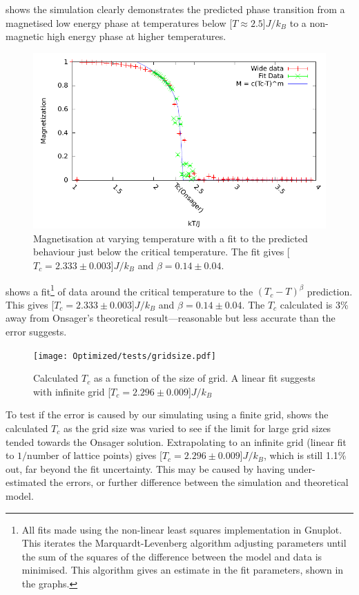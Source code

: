 \documentclass[12pt,a4paper,english]{article}
\begin{document}
 shows the simulation clearly demonstrates the predicted phase transition from a magnetised low energy phase at temperatures below \unit[$T\approx2.5$]{$J/k_B$} to a non-magnetic high energy phase at higher temperatures.

\begin{figure}
\center
\includegraphics[width=\textwidth]{Optimized/tests/detail.pdf}
\caption{Magnetisation at varying temperature with a fit to the predicted behaviour just below the critical temperature. The fit gives \unit[$T_c=2.333\pm0.003$]{$J/k_B$} and $\beta=0.14\pm0.04$.}\label{fig:detail}
\end{figure}

 shows a fit\footnote{All fits made using the non-linear least squares implementation in Gnuplot.  This iterates the Marquardt-Levenberg algorithm adjusting parameters until the sum of the squares of the difference between the model and data is minimised. This algorithm gives an estimate in the fit parameters, shown in the graphs.} of data around the critical temperature to the $\left( T_c - T\right)^\beta$ prediction.  This gives \unit[$T_c=2.333\pm0.003$]{$J/k_B$} and $\beta=0.14\pm0.04$.  The $T_c$ calculated is 3\% away from Onsager's theoretical result---reasonable but less accurate than the error suggests.

\begin{figure}
\center
\texttt{[image: Optimized/tests/gridsize.pdf]}
\caption{Calculated $T_c$ as a function of the size of grid. A linear fit suggests with infinite grid \unit[$T_c=2.296\pm0.009$]{$J/k_B$}}\label{fig:gridsize}
\end{figure}

To test if the error is caused by our simulating using a finite grid,  shows the calculated $T_c$ as the grid size  was varied to see if the limit for large grid sizes tended towards the Onsager solution.  Extrapolating to an infinite grid (linear fit to $1/\textrm{number of lattice points}$) gives \unit[$T_c=2.296\pm0.009$]{$J/k_B$}, which is still 1.1\% out, far beyond the fit uncertainty.  This may be caused by having under-estimated the errors, or further difference between the simulation and theoretical model.
\end{document}
